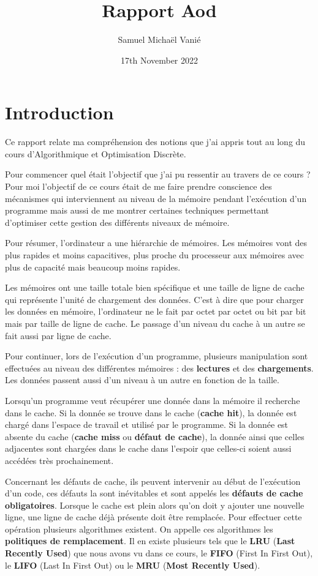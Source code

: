\documentclass[a4paper]{article}
\author{Samuel Michaël Vanié}
\date{17th November 2022}
\title{Rapport Aod}
\begin{document}
\maketitle
\tableofcontents

\clearpage

\section{Introduction}
\label{sec:orgf2f739d}

Ce rapport relate ma compréhension des notions que j'ai appris tout au long du cours d'Algorithmique et Optimisation Discrète.

Pour commencer quel était l'objectif que j'ai pu ressentir au travers de ce cours ?
Pour moi l'objectif de ce cours était de me faire prendre conscience des mécanismes qui interviennent au niveau de la mémoire pendant l'exécution d'un programme mais aussi de me montrer certaines techniques permettant d'optimiser cette gestion des différents niveaux de mémoire.

Pour résumer, l'ordinateur a une hiérarchie de mémoires. Les mémoires vont des plus rapides et moins capacitives, plus proche du processeur aux mémoires avec plus de capacité mais beaucoup moins rapides.

Les mémoires ont une taille totale bien spécifique et une taille de ligne de cache qui représente l'unité de chargement des données. C'est à dire que pour charger les données en mémoire, l'ordinateur ne le fait par octet par octet ou bit par bit mais par taille de ligne de cache. Le passage d'un niveau du cache à un autre se fait aussi par ligne de cache.

Pour continuer, lors de l'exécution d'un programme, plusieurs manipulation sont effectuées au niveau des différentes mémoires : des \textbf{lectures} et des \textbf{chargements}. Les données passent aussi d'un niveau à un autre en fonction de la taille.

Lorsqu'un programme veut récupérer une donnée dans la mémoire il recherche dans le cache. Si la donnée se trouve dans le cache (\textbf{cache hit}), la donnée est chargé dans l'espace de travail et utilisé par le programme. Si la donnée est absente du cache (\textbf{cache miss} ou \textbf{défaut de cache}), la donnée ainsi que celles adjacentes sont chargées dans le cache dans l'espoir que celles-ci soient aussi accédées très prochainement.

Concernant les défauts de cache, ils peuvent intervenir au début de l'exécution d'un code, ces défauts la sont inévitables et sont appelés les \textbf{défauts de cache obligatoires}.
Lorsque le cache est plein alors qu'on doit y ajouter une nouvelle ligne, une ligne de cache déjà présente doit être remplacée. Pour effectuer cette opération plusieurs algorithmes existent. On appelle ces algorithmes les \textbf{politiques de remplacement}. Il en existe plusieurs tels que le \textbf{LRU} (\textbf{Last Recently Used}) que nous avons vu dans ce cours, le \textbf{FIFO} (First In First Out), le \textbf{LIFO} (Last In First Out) ou le \textbf{MRU} (\textbf{Most Recently Used}).
\end{document}
